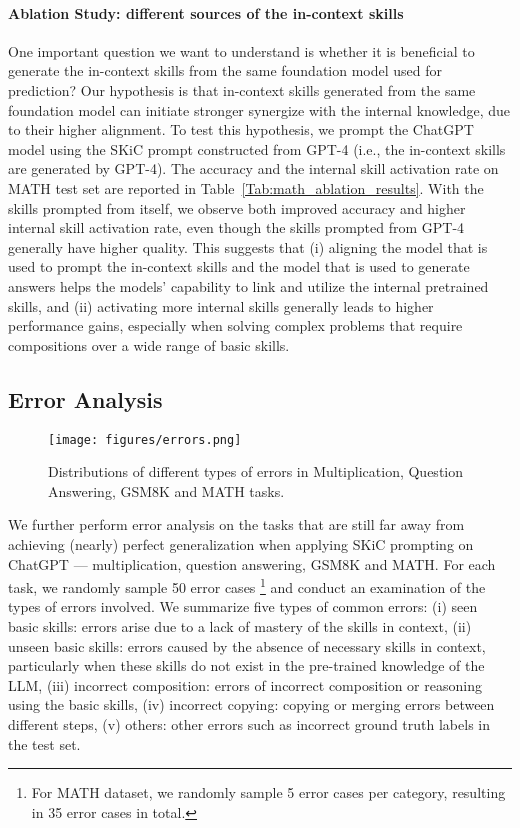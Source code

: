 \paragraph{Ablation Study: different sources of the in-context skills} One important question we want to understand is whether it is beneficial to generate the in-context skills from the same foundation model used for prediction? Our hypothesis is that in-context skills generated from the same foundation model can initiate stronger synergize with the internal knowledge, due to their higher alignment. To test this hypothesis, we prompt the ChatGPT model using the SKiC prompt constructed from GPT-4 (i.e., the in-context skills are generated by GPT-4). The accuracy and the internal skill activation rate on MATH test set are reported in Table~\ref{Tab:math_ablation_results}. With the skills prompted from itself, we observe both improved accuracy and higher internal skill activation rate, even though the skills prompted from GPT-4 generally have higher quality. This suggests that (i) aligning the model that is used to prompt the in-context skills and the model that is used to generate answers helps the models' capability to link and utilize the internal pretrained skills, and (ii) activating more internal skills generally leads to higher performance gains, especially when solving complex problems that require compositions over a wide range of basic skills.


 


\subsection{Error Analysis}


\begin{figure}[t]
    \centering
    \texttt{[image: figures/errors.png]}
    \caption{Distributions of different types of errors in Multiplication, Question Answering, GSM8K and MATH tasks.}
    \label{fig:errors}
\end{figure}



We further perform error analysis on the tasks that are still far away from achieving (nearly) perfect generalization when applying SKiC prompting on ChatGPT --- multiplication, question answering, GSM8K and MATH. For each task, we randomly sample 50 error cases \footnote{For MATH dataset, we randomly sample 5 error cases per category, resulting in 35 error cases in total.} \citep{zhou2022least} and conduct an examination of the types of errors involved. We summarize five types of common errors: (i) seen basic skills: errors arise due to a lack of mastery of the skills in context, (ii) unseen basic skills: errors caused by the absence of necessary skills in context, particularly when these skills do not exist in the pre-trained knowledge of the LLM, (iii) incorrect composition: errors of incorrect composition or reasoning using the basic skills, (iv) incorrect copying: copying or merging errors between different steps, (v) others: other errors such as incorrect ground truth labels in the test set. 



